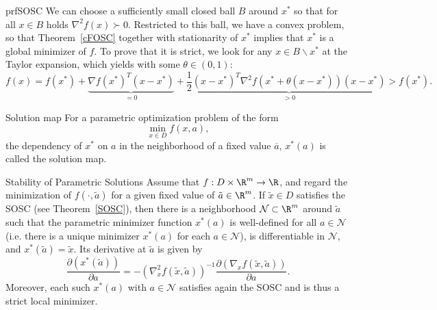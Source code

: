 \begin{prf}{prfSOSC}
    We can choose a sufficiently small closed ball $B$ around $x^*$ so that for all $x \in B$ holds $\nabla^2 f(x) \succ 0$. Restricted to this ball, we have a convex problem, so that Theorem~\ref{cFOSC} together with stationarity of $x^*$ implies that $x^*$ is a global minimizer of $f$. To prove that it is strict, we look for any $x\in B\backslash x^*$ at the Taylor expansion, which yields with some $\theta \in (0,1)$:
    \begin{equation*}
        f(x) = f(x^*) + \underbrace{\nabla {f(x^*)}^T (x - x^*)}_{=0} + \frac{1}{2} \underbrace{{(x - x^*)}^T \nabla^2 f(x^* + \theta (x - x^*)) (x - x^*)}_{>0} > f(x^*).
    \end{equation*}
    \vspace{-0.5cm}
\end{prf}

\begin{theo}{Solution map}
    For a parametric optimization problem of the form
    \begin{equation*}
        \min_{x \in D} f(x, a),
    \end{equation*}
    the dependency of $x^*$ on $a$ in the neighborhood of a fixed value $\overline{a}$, $x^*(a)$ is called the solution map.
\end{theo}

\begin{theo}{Stability of Parametric Solutions}
    Assume that $f: D \times \R^m \to \R$, and regard the minimization of $f(\cdot,\tilde{a})$ for a given fixed value of $\tilde{a} \in \R^m$. If $\tilde{x} \in D$ satisfies the SOSC (see Theorem~\ref{SOSC}), then there is a neighborhood $\mathcal{N} \subset \R^m$ around $\tilde{a}$ such that the parametric minimizer function $x^*(a)$ is well-defined for all $a \in \mathcal{N}$ (i\@.e\@. there is a unique minimizer $x^*(a)$ for each $a \in \mathcal{N}$), is differentiable in $\mathcal{N}$, and $x^*(\tilde{a}) = \tilde{x}$. Its derivative at $\tilde{a}$ is given by
    \begin{equation*}
        \frac{\partial(x^*(\tilde{a}))}{\partial a} = -{\left(\nabla^2_x f(\tilde{x}, \tilde{a})\right)}^{-1} \frac{\partial \left(\nabla_x f(\tilde{x}, \tilde{a})\right)}{\partial a}. 
    \end{equation*}
    Moreover, each such $x^*(a)$ with $a \in \mathcal{N}$ satisfies again the SOSC and is thus a strict local minimizer.
\end{theo}

